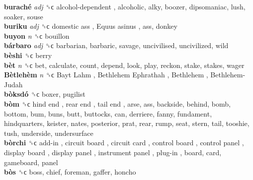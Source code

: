 \textbf{buraché} \emph{adj}  ␝ϲ   alcohol-dependent , alcoholic, alky, boozer, dipsomaniac, lush, soaker, souse  \\
\textbf{buriku} \emph{adj}  ␝ϲ   domestic ass ,  Equus asinus , ass, donkey  \\
\textbf{buyon} \emph{n}  ␝ϲ  bouillon  \\
\textbf{bárbaro} \emph{adj}  ␝ϲ  barbarian, barbaric, savage, uncivilised, uncivilized, wild  \\
\textbf{bèshi} ␝ϲ  berry  \\
\textbf{bèt} \emph{n}  ␝ϲ  bet, calculate, count, depend, look, play, reckon, stake, stakes, wager  \\
\textbf{Bètlehèm} \emph{n}  ␝ϲ   Bayt Lahm ,  Bethlehem Ephrathah ,  Bethlehem ,  Bethlehem-Judah   \\
\textbf{bòksdó} ␝ϲ  boxer, pugilist  \\
\textbf{bòm} ␝ϲ   hind end ,  rear end ,  tail end , arse, ass, backside, behind, bomb, bottom, bum, buns, butt, buttocks, can, derriere, fanny, fundament, hindquarters, keister, nates, posterior, prat, rear, rump, seat, stern, tail, tooshie, tush, underside, undersurface  \\
\textbf{bòrchi} ␝ϲ   add-in ,  circuit board ,  circuit card ,  control board ,  control panel ,  display board ,  display panel ,  instrument panel ,  plug-in , board, card, gameboard, panel  \\
\textbf{bòs} ␝ϲ  boss, chief, foreman, gaffer, honcho  \\
